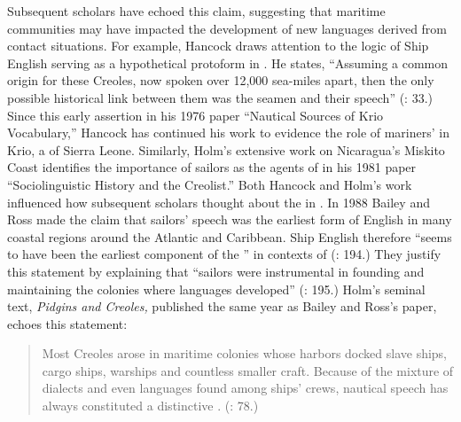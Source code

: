 Subsequent scholars have echoed this claim, suggesting that maritime communities may have impacted the development of new languages derived from contact situations. For example, Hancock draws attention to the logic of Ship English serving as a hypothetical protoform in . He states, “Assuming a common origin for these Creoles, now spoken over 12,000 sea-miles apart, then the only possible historical link between them was the seamen and their speech” (\citealt{Hancock1976}: 33.) Since this early assertion in his 1976 paper “Nautical Sources of Krio Vocabulary,” Hancock has continued his work to evidence the role of mariners’  in Krio, a  of Sierra Leone. Similarly, Holm’s extensive work on Nicaragua’s Miskito Coast  identifies the importance of sailors as the agents of  in his 1981 paper “Sociolinguistic History and the Creolist.” Both Hancock and Holm’s work influenced how subsequent scholars thought about the  in . In {1988} Bailey and Ross made the claim that sailors’ speech was the earliest form of English  in many coastal regions around the Atlantic and Caribbean. Ship English therefore “seems to have been the earliest component of the ” in contexts of  (\citealt{BaileyRoss1988}: 194.) They justify this statement by explaining that “sailors were instrumental in founding and maintaining the colonies where  languages developed” (\citealt{BaileyRoss1988}: 195.) Holm’s seminal text, \textit{Pidgins and Creoles,} published the same year as Bailey and Ross’s paper, echoes this statement: 

\begin{quotation}
Most Creoles arose in maritime colonies whose harbors docked slave ships, cargo ships, warships and countless smaller craft. Because of the mixture of dialects and even languages found among ships' crews, nautical speech has always constituted a distinctive . (\citealt{Holm1988}: 78.) \end{quotation}

